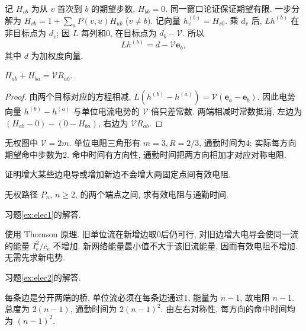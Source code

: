 记 $H_{vb}$ 为从 $v$ 首次到 $b$ 的期望步数, $H_{bb}=0$. 同一窗口论证保证期望有限. 一步分解为 $H_{vb}=1+\sum_uP(v,u)H_{ub}$ ($v\ne b$). 记向量 $h^{(b)}_v=H_{vb}$. 乘 $d_v$ 后, $Lh^{(b)}$ 在非目标点为 $d_v$; 因 $L$ 每列和0, 在目标点为 $d_b-\mathcal V$. 所以
\[
Lh^{(b)}=d-\mathcal V\mathbf e_b,
\]
其中 $d$ 为加权度向量.
\begin{theorem}[通勤时间]\label{thm:commute}
$H_{ab}+H_{ba}=\mathcal V R_{ab}$.
\end{theorem}
\begin{proof}
由两个目标对应的方程相减,
$L(h^{(b)}-h^{(a)})=\mathcal V(\mathbf e_a-\mathbf e_b)$.
因此电势向量 $h^{(b)}-h^{(a)}$ 与单位电流电势的 $\mathcal V$ 倍只差常数. 两端相减时常数抵消, 左边为 $(H_{ab}-0)-(0-H_{ba})$, 右边为 $\mathcal V R_{ab}$.
\end{proof}
无权图中 $\mathcal V=2m$. 单位电阻三角形有 $m=3,R=2/3$, 通勤时间为4; 实际每方向期望命中步数为2. 命中时间有方向性, 通勤时间把两方向相加才对应对称电阻.
\begin{exercise}\label{ex:elec1}
证明增大某些边电导或增加新边不会增大两固定点间有效电阻.
\end{exercise}
\begin{exercise}\label{ex:elec2}
无权路径 $P_n$, $n\ge2$, 的两个端点之间, 求有效电阻与通勤时间.
\end{exercise}
习题\ref{ex:elec1}的解答.
\begin{solution}
使用 Thomson 原理. 旧单位流在新增边取0后仍可行, 对旧边增大电导会使同一流的能量 $I_e^2/c_e$ 不增加. 新网络能量最小值不大于该旧流能量, 因而有效电阻不增加. 无需先求新电势.
\end{solution}
习题\ref{ex:elec2}的解答.
\begin{solution}
每条边是分开两端的桥, 单位流必须在每条边通过1, 能量为 $n-1$, 故电阻 $n-1$. 总度为 $2(n-1)$, 通勤时间为 $2(n-1)^2$. 由左右对称性, 每方向的命中时间均为 $(n-1)^2$.
\end{solution}
